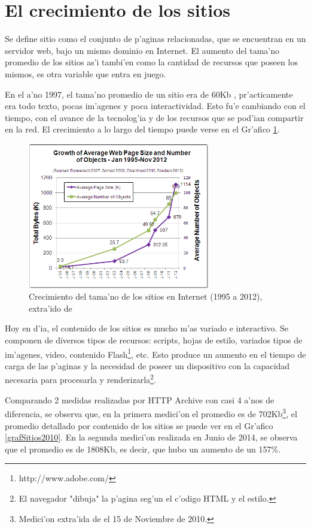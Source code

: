 \section{El crecimiento de los sitios}

Se define sitio como el conjunto de p'aginas relacionadas, que se encuentran en un servidor web, bajo un mismo dominio en Internet. El aumento del tama'no promedio de los sitios as'i tambi'en como la cantidad de recursos que poseen los mismos, es otra variable que entra en juego.

En el a'no 1997, el tama'no promedio de un sitio era de 60Kb \citep{atw}, pr'acticamente era todo texto, pocas im'agenes y poca interactividad. Esto fu'e cambiando con el tiempo, con el avance de la tecnolog'ia y de los recursos que se pod'ian compartir en la red. El crecimiento a lo largo del tiempo puede verse en el Gr'afico \ref{grafCrecSitios}.

\begin{figure}[ht!]
  	\centering
	\includegraphics[width=300px]{img/grafCrecSitios}
	\caption{\small Crecimiento del tama'no de los sitios en Internet (1995 a 2012), extra'ido de \cite{tamanoSitios}}
	\label{grafCrecSitios}
\end{figure}

Hoy en d'ia, el contenido de los sitios es mucho m'as variado e interactivo. Se componen de diversos tipos de recursos: scripts, hojas de estilo, variados tipos de im'agenes, video, contenido Flash\footnote{http://www.adobe.com/}, etc. Esto produce un aumento en el tiempo de carga de las p'aginas y la necesidad de poseer un dispositivo con la capacidad necesaria para procesarla y renderizarla\footnote{El navegador "dibuja" la p'agina seg'un el c'odigo HTML y el estilo.}.

\vspace{1cm}

Comparando 2 medidas realizadas por HTTP Archive \citep{httparchive}  con casi 4 a'nos de diferencia, se observa que, en la primera medici'on el promedio es de 702Kb\footnote{Medici'on extra'ida de \citep{httparchive} el 15 de Noviembre de 2010.}, el promedio detallado por contenido de los sitios se puede ver en el Gr'afico \ref{grafSitios2010}. En la segunda medici'on realizada en Junio de 2014, se observa que el promedio es de 1808Kb, es decir, que hubo un aumento de un 157\%.

